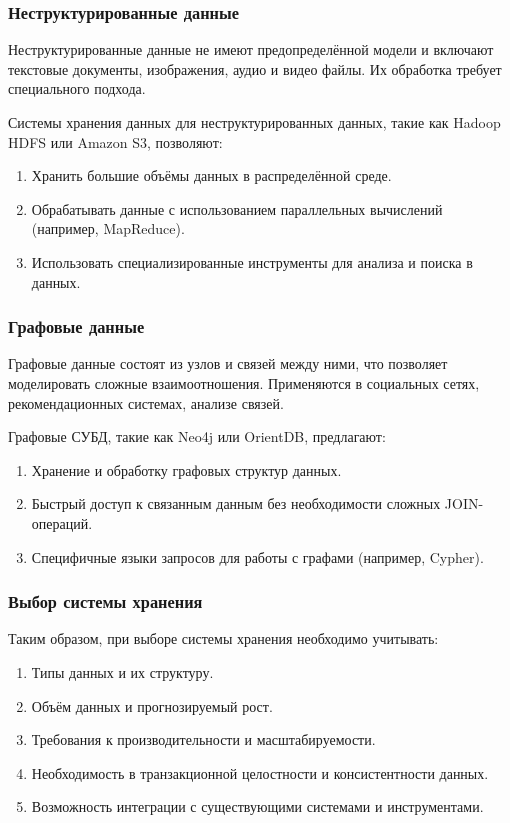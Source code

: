 \subsubsection{Неструктурированные данные}

Неструктурированные данные не имеют предопределённой модели и включают текстовые документы, изображения, аудио и видео файлы. Их обработка требует специального подхода.

\clearpage
Системы хранения данных для неструктурированных данных, такие как Hadoop HDFS или Amazon S3, позволяют:

\begin{enumerate}[wide=12.5mm, leftmargin=12.5mm]
    \item Хранить большие объёмы данных в распределённой среде.
    \item Обрабатывать данные с использованием параллельных вычислений (например, MapReduce).
    \item Использовать специализированные инструменты для анализа и поиска в данных.
\end{enumerate}

\subsubsection{Графовые данные}

Графовые данные состоят из узлов и связей между ними, что позволяет моделировать сложные взаимоотношения. 
Применяются в социальных сетях, рекомендационных системах, анализе связей.

Графовые СУБД, такие как Neo4j или OrientDB, предлагают:

\begin{enumerate}[wide=12.5mm, leftmargin=12.5mm]
    \item Хранение и обработку графовых структур данных.
    \item Быстрый доступ к связанным данным без необходимости сложных JOIN-операций.
    \item Специфичные языки запросов для работы с графами (например, Cypher).
\end{enumerate}

\subsubsection{Выбор системы хранения}

Таким образом, при выборе системы хранения необходимо учитывать:

\begin{enumerate}[wide=12.5mm, leftmargin=12.5mm]
    \item Типы данных и их структуру.
    \item Объём данных и прогнозируемый рост.
    \item Требования к производительности и масштабируемости.
    \item Необходимость в транзакционной целостности и консистентности данных.
    \item Возможность интеграции с существующими системами и инструментами.
\end{enumerate}

